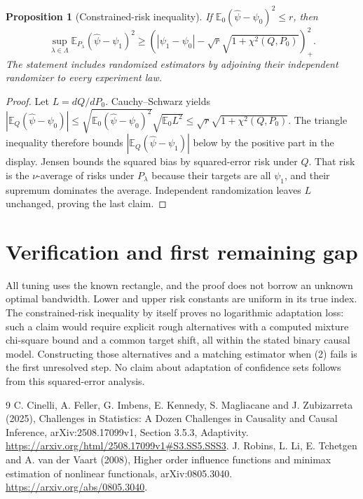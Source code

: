 \documentclass[11pt]{article}
\newtheorem{proposition}[theorem]{Proposition}
\theoremstyle{remark}
\newcommand{\E}{\mathbb E}
\begin{document}
\begin{proposition}[Constrained-risk inequality]
If $\E_0(\widehat\psi-\psi_0)^2\leq r$, then
\[
 \sup_{\lambda\in\Lambda}
 \E_{P_\lambda}(\widehat\psi-\psi_1)^2
 \geq\left(|\psi_1-\psi_0|
       -\sqrt{r}\sqrt{1+\chi^2(Q,P_0)}\right)_+^2.
\]
The statement includes randomized estimators by adjoining their
independent randomizer to every experiment law.
\end{proposition}
\begin{proof}
Let $L=dQ/dP_0$. Cauchy--Schwarz yields
$|\E_Q(\widehat\psi-\psi_0)|
\leq\sqrt{\E_0(\widehat\psi-\psi_0)^2}\sqrt{\E_0L^2}
\leq\sqrt r\sqrt{1+\chi^2(Q,P_0)}$.
The triangle inequality therefore bounds
$|\E_Q(\widehat\psi-\psi_1)|$ below by the positive part in the
display. Jensen bounds the squared bias by squared-error risk under
$Q$. That risk is the $\nu$-average of risks under $P_\lambda$ because
their targets are all $\psi_1$, and their supremum dominates the average.
Independent randomization leaves $L$ unchanged, proving the last claim.
\end{proof}

\section{Verification and first remaining gap}
All tuning uses the known rectangle, and the proof does not borrow an
unknown optimal bandwidth. Lower and upper risk constants are uniform
in its true index. The constrained-risk inequality by itself proves no
logarithmic adaptation loss: such a claim would require explicit rough
alternatives with a computed mixture chi-square bound and a common
target shift, all within the stated binary causal model. Constructing
those alternatives and a matching estimator when (2) fails is the first
unresolved step. No claim about adaptation of confidence sets follows
from this squared-error analysis.

\begin{thebibliography}{9}
 C. Cinelli, A. Feller, G. Imbens, E. Kennedy,
S. Magliacane and J. Zubizarreta (2025), Challenges in Statistics:
A Dozen Challenges in Causality and Causal Inference,
arXiv:2508.17099v1, Section 3.5.3, Adaptivity.
\url{https://arxiv.org/html/2508.17099v1#S3.SS5.SSS3}.
 J. Robins, L. Li, E. Tchetgen and A. van der Vaart (2008),
Higher order influence functions and minimax estimation of nonlinear
functionals, arXiv:0805.3040. \url{https://arxiv.org/abs/0805.3040}.
\end{thebibliography}
\end{document}
